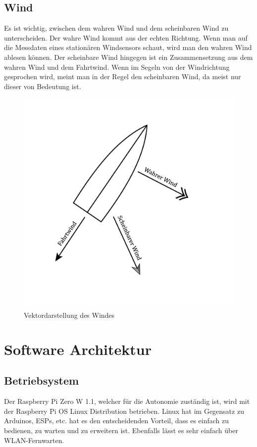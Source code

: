 \subsection{Wind}
Es ist wichtig, zwischen dem wahren Wind und dem scheinbaren Wind zu unterscheiden. Der wahre Wind kommt aus der echten Richtung. Wenn man auf die Messdaten eines stationären Windsensors schaut, wird man den wahren Wind ablesen können. Der scheinbare Wind hingegen ist ein Zusammensetzung aus dem wahren Wind und dem Fahrtwind. Wenn im Segeln von der Windrichtung gesprochen wird, meint man in der Regel den scheinbaren Wind, da meist nur dieser von Bedeutung ist.
\begin{figure}
    \centering
    \includegraphics[width=0.75\linewidth]{assets/scheinbarerwind.png}
    \caption{Vektordarstellung des Windes}
    
\end{figure}

\section{Software Architektur}
\subsection*{Betriebsystem}
Der Raspberry Pi Zero W 1.1, welcher für die Autonomie zuständig ist, wird mit der Raspberry Pi OS Linux Distribution betrieben. Linux hat im Gegensatz zu Arduinos, ESPs, etc. hat es den entscheidenden Vorteil, dass es einfach zu bedienen, zu warten und zu erweitern ist. Ebenfalls lässt es sehr einfach über WLAN-Fernwarten.

